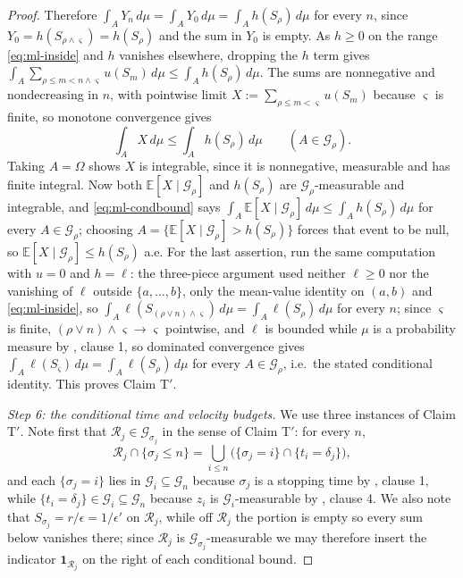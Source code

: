 \begin{proof}
Therefore $\int_AY_n\,d\mu=\int_AY_0\,d\mu=\int_Ah(S_\rho)\,d\mu$ for every
$n$, since $Y_0=h(S_{\rho\wedge\varsigma})=h(S_\rho)$ and the sum in $Y_0$ is
empty. As $h\ge0$ on the range \eqref{eq:ml-inside} and $h$ vanishes elsewhere,
dropping the $h$ term gives
$\int_A\sum_{\rho\le m<n\wedge\varsigma}u(S_m)\,d\mu
 \le\int_Ah(S_\rho)\,d\mu$. The sums are nonnegative and nondecreasing in $n$,
with pointwise limit $X:=\sum_{\rho\le m<\varsigma}u(S_m)$ because $\varsigma$
is finite, so monotone convergence gives
\begin{equation}\label{eq:ml-condbound}
  \int_AX\,d\mu\le\int_Ah(S_\rho)\,d\mu\qquad(A\in\mathcal G_\rho).
\end{equation}
Taking $A=\Omega$ shows $X$ is integrable, since it is nonnegative, measurable
and has finite integral. Now both $\mathbb E[X\mid\mathcal G_\rho]$ and
$h(S_\rho)$ are $\mathcal G_\rho$-measurable and integrable, and
\eqref{eq:ml-condbound} says
$\int_A\mathbb E[X\mid\mathcal G_\rho]\,d\mu\le\int_Ah(S_\rho)\,d\mu$ for every
$A\in\mathcal G_\rho$; choosing
$A=\{\mathbb E[X\mid\mathcal G_\rho]>h(S_\rho)\}$ forces that event to be null,
so $\mathbb E[X\mid\mathcal G_\rho]\le h(S_\rho)$ a.e. For the last assertion,
run the same computation with $u=0$ and $h=\ell$: the three-piece argument used
neither $\ell\ge0$ nor the vanishing of $\ell$ outside $\{a,\dots,b\}$, only the
mean-value identity on $(a,b)$ and \eqref{eq:ml-inside}, so
$\int_A\ell(S_{(\rho\vee n)\wedge\varsigma})\,d\mu
 =\int_A\ell(S_\rho)\,d\mu$ for every $n$; since $\varsigma$ is finite,
$(\rho\vee n)\wedge\varsigma\to\varsigma$ pointwise, and $\ell$ is bounded while
$\mu$ is a probability measure by , clause 1, so
dominated convergence gives
$\int_A\ell(S_\varsigma)\,d\mu=\int_A\ell(S_\rho)\,d\mu$ for every
$A\in\mathcal G_\rho$, i.e.\ the stated conditional identity. This proves
Claim T$'$.

\emph{Step 6: the conditional time and velocity budgets.}
We use three instances of Claim T$'$. Note first that
$\mathcal R_j\in\mathcal G_{\sigma_j}$ in the sense of Claim T$'$: for every
$n$,
\[
  \mathcal R_j\cap\{\sigma_j\le n\}
   =\bigcup_{i\le n}\bigl(\{\sigma_j=i\}\cap\{t_i=\delta_j\}\bigr),
\]
and each $\{\sigma_j=i\}$ lies in $\mathcal G_i\subseteq\mathcal G_n$ because
$\sigma_j$ is a stopping time by , clause 1, while
$\{t_i=\delta_j\}\in\mathcal G_i\subseteq\mathcal G_n$ because $z_i$ is
$\mathcal G_i$-measurable by , clause 4. We also note
that $S_{\sigma_j}=r/\epsilon=1/\epsilon'$
on $\mathcal R_j$, while off $\mathcal R_j$ the portion is empty so every sum
below vanishes there; since $\mathcal R_j$ is $\mathcal G_{\sigma_j}$-measurable
we may therefore insert the indicator $\mathbf1_{\mathcal R_j}$ on the right of
each conditional bound.


\end{proof}
